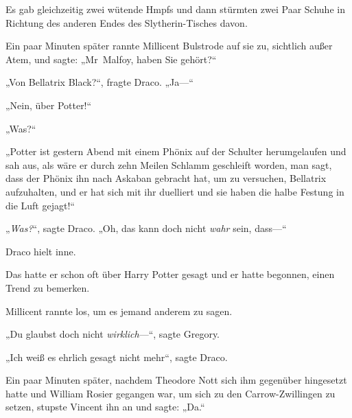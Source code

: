 Es gab gleichzeitig zwei wütende Hmpfs und dann stürmten zwei Paar Schuhe in Richtung des anderen Endes des Slytherin-Tisches davon.

Ein paar Minuten später rannte Millicent Bulstrode auf sie zu, sichtlich außer Atem, und sagte: „Mr~Malfoy, haben Sie gehört?“

„Von Bellatrix Black?“, fragte Draco. „Ja—“

„Nein, über Potter!“

„Was?“

„Potter ist gestern Abend mit einem Phönix auf der Schulter herumgelaufen und sah aus, als wäre er durch zehn Meilen Schlamm geschleift worden, man sagt, dass der Phönix ihn nach Askaban gebracht hat, um zu versuchen, Bellatrix aufzuhalten, und er hat sich mit ihr duelliert und sie haben die halbe Festung in die Luft gejagt!“

„\emph{Was?}“, sagte Draco. „Oh, das kann doch nicht \emph{wahr} sein, dass—“

Draco hielt inne.

Das hatte er schon oft über Harry Potter gesagt und er hatte begonnen, einen Trend zu bemerken.

Millicent rannte los, um es jemand anderem zu sagen.

„Du glaubst doch nicht \emph{wirklich}—“, sagte Gregory.

„Ich weiß es ehrlich gesagt nicht mehr“, sagte Draco.

Ein paar Minuten später, nachdem Theodore Nott sich ihm gegenüber hingesetzt hatte und William Rosier gegangen war, um sich zu den Carrow-Zwillingen zu setzen, stupste Vincent ihn an und sagte: „Da.“

